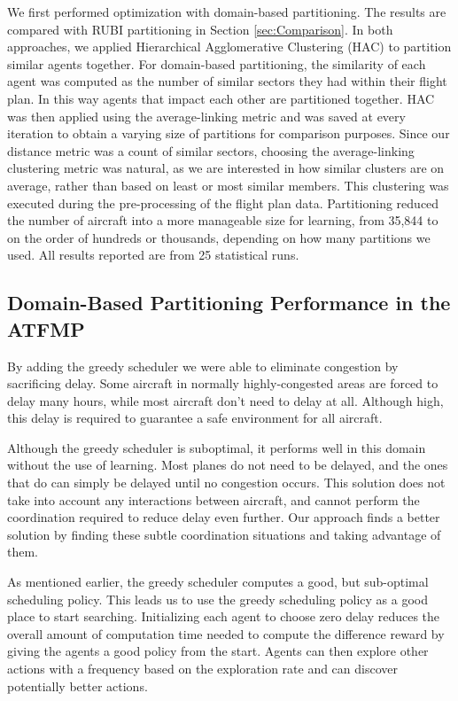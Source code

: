 \documentclass[smallcondensed]{svjour3}
\begin{document}
We first performed optimization with domain-based partitioning. The results are compared with RUBI partitioning in Section \ref{sec:Comparison}. In both approaches, we applied Hierarchical Agglomerative Clustering (HAC) to partition similar agents together. For domain-based partitioning, the similarity of each agent was computed as the number of similar sectors they had within their flight plan. In this way agents that impact each other are partitioned together. HAC was then applied using the average-linking metric and was saved at every iteration to obtain a varying size of partitions for comparison purposes. Since our distance metric was a count of similar sectors, choosing the average-linking clustering metric was natural, as we are interested in how similar clusters are on average, rather than based on least or most similar members. This clustering was executed during the pre-processing of the flight plan data. Partitioning reduced the number of aircraft into a more manageable size for learning, from 35,844 to on the order of hundreds or thousands, depending on how many partitions we used. All results reported are from 25 statistical runs.
 
\subsection{Domain-Based Partitioning Performance in the ATFMP}

By adding the greedy scheduler we were able to eliminate congestion by sacrificing delay. Some aircraft in normally highly-congested areas are forced to delay many hours, while most aircraft don't need to delay at all. Although high, this delay is required to guarantee a safe environment for all aircraft. 

Although the greedy scheduler is suboptimal, it performs well in this domain without the use of learning. Most planes do not need to be delayed, and the ones that do can simply be delayed until no congestion occurs. This solution does not take into account any interactions between aircraft, and cannot perform the coordination required to reduce delay even further. Our approach finds a better solution by finding these subtle coordination situations and taking advantage of them.  

As mentioned earlier, the greedy scheduler computes a good, but sub-optimal scheduling policy. This leads us to use the greedy scheduling policy as a good place to start searching. Initializing each agent to choose zero delay reduces the overall amount of computation time needed to compute the difference reward by giving the agents a good policy from the start. Agents can then explore other actions with a frequency based on the exploration rate and can discover potentially better actions.
  
\end{document}
